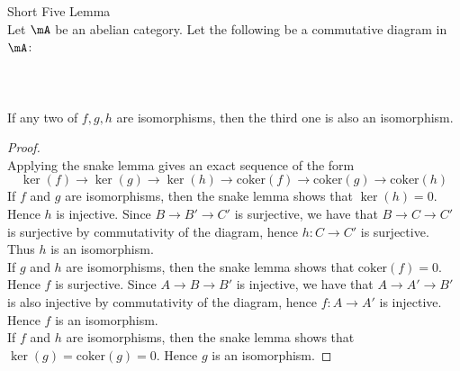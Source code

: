 \documentclass[a4paper]{article}
\begin{document}
\begin{lmm}{Short Five Lemma}{}\\
Let $\mA$ be an abelian category. Let the following be a commutative diagram in $\mA$: \\~\\
\\~\\
If any two of $f,g,h$ are isomorphisms, then the third one is also an isomorphism. 
\begin{proof}\\
Applying the snake lemma gives an exact sequence of the form $$\ker(f)\to\ker(g)\to\ker(h)\to\text{coker}(f)\to\text{coker}(g)\to\text{coker}(h)$$ If $f$ and $g$ are isomorphisms, then the snake lemma shows that $\ker(h)=0$. Hence $h$ is injective. Since $B\to B'\to C'$ is surjective, we have that $B\to C\to C'$ is surjective by commutativity of the diagram, hence $h:C\to C'$ is surjective. Thus $h$ is an isomorphism. \\

If $g$ and $h$ are isomorphisms, then the snake lemma shows that $\text{coker}(f)=0$. Hence $f$ is surjective. Since $A\to B\to B'$ is injective, we have that $A\to A'\to B'$ is also injective by commutativity of the diagram, hence $f:A\to A'$ is injective. Hence $f$ is an isomorphism. \\

If $f$ and $h$ are isomorphisms, then the snake lemma shows that $\ker(g)=\text{coker}(g)=0$. Hence $g$ is an isomorphism. 
\end{proof}
\end{lmm}
\end{document}
